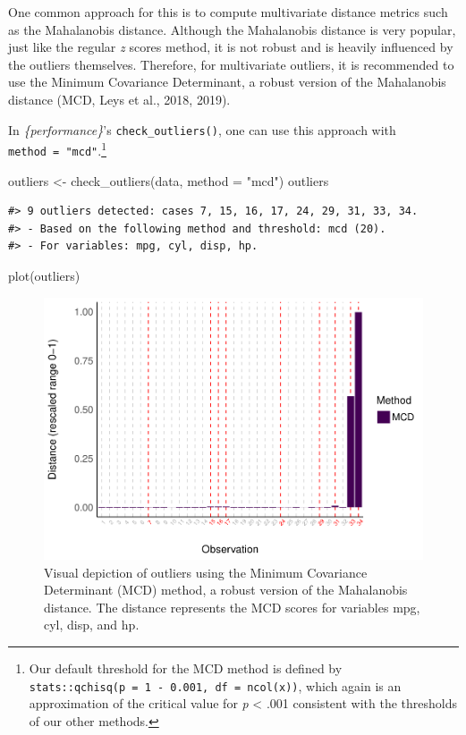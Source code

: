 \documentclass{article}
\newenvironment{Shaded}{\begin{snugshade}}{\end{snugshade}}
\newcommand{\AttributeTok}[1]{\textcolor[rgb]{0.77,0.63,0.00}{#1}}
\newcommand{\FunctionTok}[1]{\textcolor[rgb]{0.00,0.00,0.00}{#1}}
\newcommand{\NormalTok}[1]{#1}
\newcommand{\OtherTok}[1]{\textcolor[rgb]{0.56,0.35,0.01}{#1}}
\newcommand{\StringTok}[1]{\textcolor[rgb]{0.31,0.60,0.02}{#1}}
\begin{document}
One common approach for this is to compute multivariate distance metrics
such as the Mahalanobis distance. Although the Mahalanobis distance is
very popular, just like the regular \emph{z} scores method, it is not
robust and is heavily influenced by the outliers themselves. Therefore,
for multivariate outliers, it is recommended to use the Minimum
Covariance Determinant, a robust version of the Mahalanobis distance
(MCD, Leys et al., 2018, 2019).

In \emph{\{performance\}}'s \texttt{check\_outliers()}, one can use this
approach with \texttt{method\ =\ "mcd"}.\footnote{Our default threshold
  for the MCD method is defined by
  \texttt{stats::qchisq(p\ =\ 1\ -\ 0.001,\ df\ =\ ncol(x))}, which
  again is an approximation of the critical value for \emph{p}
  \textless{} .001 consistent with the thresholds of our other methods.}

\begin{Shaded}
\begin{Highlighting}[]
\NormalTok{outliers }\OtherTok{\textless{}{-}} \FunctionTok{check\_outliers}\NormalTok{(data, }\AttributeTok{method =} \StringTok{"mcd"}\NormalTok{)}
\NormalTok{outliers}
\end{Highlighting}
\end{Shaded}

\begin{verbatim}
#> 9 outliers detected: cases 7, 15, 16, 17, 24, 29, 31, 33, 34.
#> - Based on the following method and threshold: mcd (20).
#> - For variables: mpg, cyl, disp, hp.
\end{verbatim}

\begin{Shaded}
\begin{Highlighting}[]
\FunctionTok{plot}\NormalTok{(outliers)}
\end{Highlighting}
\end{Shaded}

\begin{figure}
\includegraphics[width=1\linewidth]{paper_files/figure-latex/multivariate_implicit-1} \caption{Visual depiction of outliers using the Minimum Covariance Determinant (MCD) method, a robust version of the Mahalanobis distance. The distance represents the MCD scores for variables mpg, cyl, disp, and hp.}\label{fig:multivariate_implicit}
\end{figure}
\end{document}
